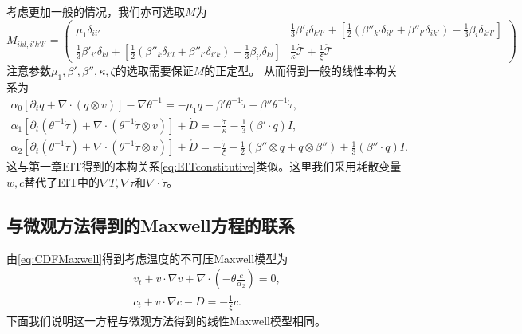 	考虑更加一般的情况，我们亦可选取$M$为
	\begin{equation*}
		M_{ikl,i'k'l'} = \left( \begin{array}{ccc} 
			\mu_1 \delta_{ii' } & \frac{1}{3}\beta'_i \delta_{k'l'} +  [\frac{1}{2} (\beta''_{k'} \delta_{il'} + \beta''_{l'} \delta_{ik'}) - \frac{1}{3} \beta_{i} \delta_{k'l'}]\\
			\frac{1}{3}\beta'_{i'} \delta_{kl} +  [\frac{1}{2} (\beta''_{k} \delta_{i'l} + \beta''_{l'} \delta_{i'k}) - \frac{1}{3} \beta_{i'} \delta_{kl}] &  \frac{1}{\kappa} \dot{\mathcal{T}} + \frac{1}{\xi} \mathring{\mathcal{T}}  
		\end{array} \right)
	\end{equation*} 
	注意参数$\mu_1,\beta',\beta'',\kappa,\zeta$的选取需要保证$M$的正定型。
	从而得到一般的线性本构关系为
	\begin{subequations}
		\begin{align*}
			\alpha_0 [\partial_t q +  \nabla \cdot (q \otimes v)] - \nabla \theta^{-1} = - \mu_1 q -\beta' \theta^{-1} \dot{\tau} - \beta'' \theta^{-1} \mathring{\tau} , \\
			\alpha_1[\partial_t (\theta^{-1} \dot{\tau}) + \nabla \cdot (\theta^{-1} \dot{\tau} \otimes v)] + \dot{D} = -\frac{\dot{\tau}}{\kappa} - \frac{1}{3}(\beta' \cdot q) I, \\
			\alpha_2[\partial_t (\theta^{-1} \mathring{\tau}) + \nabla \cdot (\theta^{-1} \mathring{\tau} \otimes v)] + \mathring{D} = -\frac{\dot{\tau}}{\xi} - \frac{1}{2} (\beta''  \otimes q + q \otimes \beta'') + \frac{1}{3}(\beta'' \cdot q) I. 
		\end{align*}
	\end{subequations}
	这与第一章EIT得到的本构关系\eqref{eq:EITconstitutive}类似。这里我们采用耗散变量$w,c$替代了EIT中的$\nabla T, \nabla \dot{\tau}$和$\nabla \cdot{\mathring{\tau}}$。
    
	\subsection{与微观方法得到的Maxwell方程的联系}

	由\eqref{eq:CDFMaxwell}得到考虑温度的不可压Maxwell模型为
	\begin{eqnarray} \label{eq:Tmaxwell}
		v_t + v \cdot \nabla v + \nabla \cdot (-\theta \frac{c}{\alpha_2}) = 0, \\
		c_t + v \cdot \nabla c - D = -\frac{1}{\xi} c.
	\end{eqnarray}
	下面我们说明这一方程与微观方法得到的线性Maxwell模型相同。

